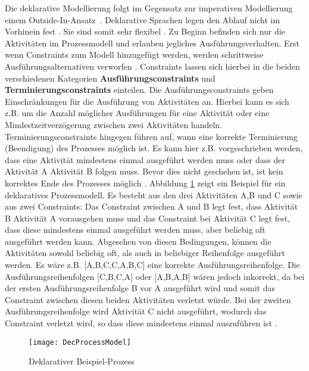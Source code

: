  Die deklarative Modellierung folgt im Gegensatz zur imperativen Modellierung einem \grqq Outside-In-Ansatz\grqq \ \cite{lichtenegger2012}. Deklarative Sprachen legen den Ablauf nicht im Vorhinein fest \cite{pichler2012}. Sie sind somit sehr flexibel \cite{reichert2012}. Zu Beginn befinden sich nur die Aktivitäten im Prozessmodell und erlauben jegliches Ausführungsverhalten. Erst wenn Constraints zum Modell hinzugefügt werden, werden schrittweise Ausführungsalternativen verworfen \cite{pichler2012}. Constraints lassen sich hierbei in die beiden verschiedenen Kategorien \textbf{Ausführungsconstraints} und \textbf{Terminierungsconstraints} einteilen. Die Ausführungsconstraints geben Einschränkungen für die Ausführung von Aktivitäten an. Hierbei kann es sich z.B. um die Anzahl möglicher Ausführungen für eine Aktivität oder eine Mindestzeitverzögerung zwischen zwei Aktivitäten handeln. Terminierungsconstraints hingegen führen auf, wann eine korrekte Terminierung (Beendigung) des Prozesses möglich ist. Es kann hier z.B. vorgeschrieben werden, dass eine Aktivität mindestens einmal ausgeführt werden muss oder dass der Aktivität A Aktivität B folgen muss. Bevor dies nicht geschehen ist, ist kein korrektes Ende des Prozesses möglich \cite{reichert2012}.  Abbildung \ref{fig:Dec} zeigt ein Beispiel für ein deklaratives Prozessmodell. Es besteht aus den drei Aktivitäten A,B und C sowie aus zwei Constraints:  Das Constraint zwischen A und B legt fest, dass Aktivität B Aktivität A vorausgehen muss und das Constraint bei Aktivität C legt fest, dass diese mindestens einmal ausgeführt werden muss, aber beliebig oft ausgeführt werden kann. Abgesehen von diesen Bedingungen, können die Aktivitäten sowohl beliebig oft, als auch in beliebiger Reihenfolge ausgeführt werden. Es wäre z.B. [A,B,C,C,A,B,C] eine korrekte Ausführungsreihenfolge. Die Ausführungsreihenfolgen [C,B,C,A] oder [A,B,A,B] wären jedoch inkorrekt, da bei der ersten Ausführungsreihenfolge B vor A ausgeführt wird und somit das Constraint zwischen diesen beiden Aktivitäten verletzt würde. Bei der zweiten Ausführungsreihenfolge wird Aktivität C nicht ausgeführt, wodurch das Constraint verletzt wird, so dass diese mindestens einmal auszuführen ist \cite{reichert2012}. \newline

\begin{figure}[H]
\begin{center}
  \texttt{[image: DecProcessModel]} %
  \caption{Deklarativer Beispiel-Prozess \cite{pesic2006}}
  \label{fig:Dec}
\end{center}
\end{figure} 

